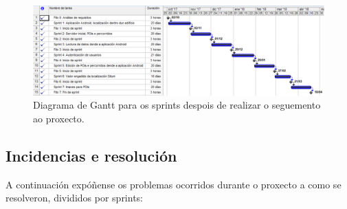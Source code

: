 \begin{figure}[tbh] 
	\begin{center}
		\includegraphics[width=1\textwidth]{figures/Capturas/planificacionFinal}
		\caption{Diagrama de Gantt para os sprints despois de realizar o seguemento ao proxecto.}
		\label{fig:planificacionFinal}
	\end{center}
\end{figure}

\subsection{Incidencias e resolución}
A continuación expóñense os problemas ocorridos durante o proxecto a como se resolveron, divididos por sprints:

